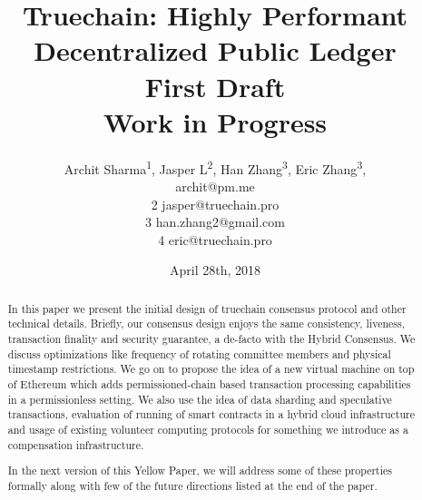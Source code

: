 \documentclass[9pt,oneside]{amsart}
\title{%
  \bf Truechain: Highly Performant Decentralized Public Ledger \\
  \small First Draft \\
  \small Work in Progress}
\date{April 28th, 2018}
\author{%
 Archit Sharma\textsuperscript{1}, Jasper L\textsuperscript{2}, Han Zhang\textsuperscript{3}, Eric Zhang\textsuperscript{3}, \\[1ex]
 \newline
 1 archit@pm.me\\
 2 jasper@truechain.pro\\
 3 han.zhang2@gmail.com\\
 4 eric@truechain.pro\\
 }
\begin{document}


\pagecolor{yellowpapercolor}

\begin{abstract}
In this paper we present the initial design of truechain consensus protocol and other technical details.
Briefly, our consensus design enjoys the same consistency, liveness, transaction finality and security guarantee, a
de-facto with the Hybrid Consensus. We discuss optimizations like frequency of rotating committee members and physical
timestamp restrictions. We go on to propose the idea of a new virtual machine on top of Ethereum which adds
permissioned-chain based transaction processing capabilities in a permissionless setting. We also use the idea of
data sharding and speculative transactions, evaluation of running of smart contracts in a hybrid cloud infrastructure and
usage of existing volunteer computing protocols for something we introduce as a compensation infrastructure.

In the next version of this Yellow Paper, we will address some of these properties formally along with few of the future
directions listed at the end of the paper.
\end{abstract}

\maketitle
\end{document}

